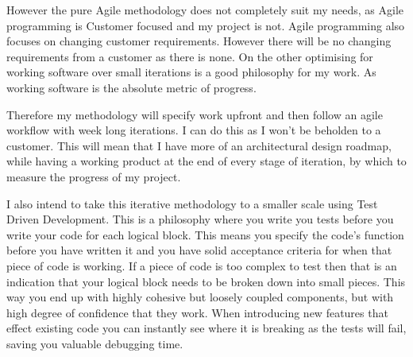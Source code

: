 However the  pure Agile methodology does not completely suit my needs, as Agile
programming is Customer focused and my project is not. Agile programming also
focuses on changing customer requirements. However there will be no changing
requirements from a customer as there is none. On the other optimising for
working software over small iterations is a good philosophy for my work. As
working software is the absolute metric of progress.

Therefore my methodology will specify work upfront and then follow an agile
workflow with week long iterations. I can do this as I won't be beholden to a
customer. This will mean that I have more of an architectural design roadmap,
while having a working product at the end of every stage of iteration, by which
to measure the progress of my project.

I also intend to take this iterative methodology to a smaller scale using Test
Driven Development. \cite{beck2003test} This is a philosophy where you write you tests before you
write your code for each logical block. This means you specify the code's
function before you have written it and you have solid acceptance criteria for
when that piece of code is working. If a piece of code is too complex to test
then that is an indication that your logical block needs to be broken down into
small pieces. This way you end up with highly cohesive but loosely coupled
components, but with high degree of confidence that they work. When introducing
new features that effect existing code you can instantly see where it is
breaking as the tests will fail, saving you valuable debugging time.

